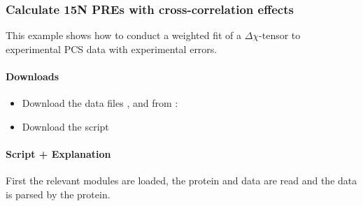 \documentclass[a4paper,10pt,english]{sphinxmanual}
\begin{document}
\begin{sphinxVerbatim}[commandchars=\\\{\}]
\end{sphinxVerbatim}

\noindent{}


\subsubsection{Calculate 15N PREs with cross-correlation effects}
\label{\detokenize{examples/pre_calc_nitrogen:calculate-15n-pres-with-cross-correlation-effects}}\label{\detokenize{examples/pre_calc_nitrogen:pre-calc-nitrogen}}\label{\detokenize{examples/pre_calc_nitrogen::doc}}
This example shows how to conduct a weighted fit of a \({\Delta\chi}\)-tensor to experimental PCS data with experimental errors.


\paragraph{Downloads}
\label{\detokenize{examples/pre_calc_nitrogen:downloads}}\begin{itemize}
\item {} 
Download the data files ,  and  from :

\item {} 
Download the script 

\end{itemize}


\paragraph{Script + Explanation}
\label{\detokenize{examples/pre_calc_nitrogen:script-explanation}}
First the relevant modules are loaded, the protein and data are read and the data is parsed by the protein.
\end{document}
